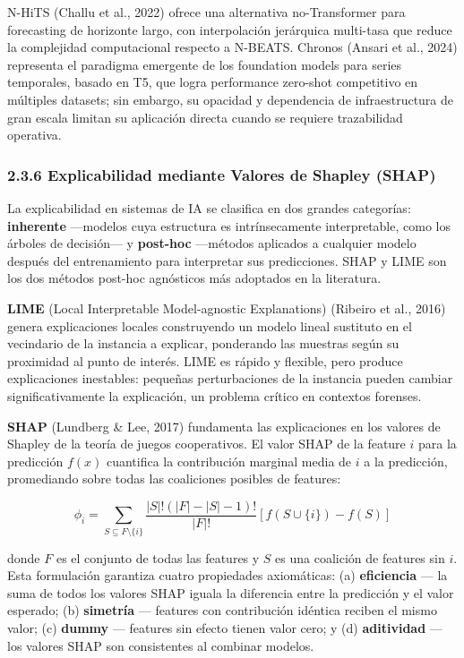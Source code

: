 N-HiTS (Challu et al., 2022) ofrece una alternativa no-Transformer para
forecasting de horizonte largo, con interpolación jerárquica multi-tasa
que reduce la complejidad computacional respecto a N-BEATS. Chronos
(Ansari et al., 2024) representa el paradigma emergente de los
foundation models para series temporales, basado en T5, que logra
performance zero-shot competitivo en múltiples datasets; sin embargo, su
opacidad y dependencia de infraestructura de gran escala limitan su
aplicación directa cuando se requiere trazabilidad operativa.

\subsubsection{2.3.6 Explicabilidad mediante Valores de Shapley
(SHAP)}\label{explicabilidad-mediante-valores-de-shapley-shap}

La explicabilidad en sistemas de IA se clasifica en dos grandes
categorías: \textbf{inherente} ---modelos cuya estructura es
intrínsecamente interpretable, como los árboles de decisión--- y
\textbf{post-hoc} ---métodos aplicados a cualquier modelo después del
entrenamiento para interpretar sus predicciones. SHAP y LIME son los dos
métodos post-hoc agnósticos más adoptados en la literatura.

\textbf{LIME} (Local Interpretable Model-agnostic Explanations) (Ribeiro
et al., 2016) genera explicaciones locales construyendo un modelo lineal
sustituto en el vecindario de la instancia a explicar, ponderando las
muestras según su proximidad al punto de interés. LIME es rápido y
flexible, pero produce explicaciones inestables: pequeñas perturbaciones
de la instancia pueden cambiar significativamente la explicación, un
problema crítico en contextos forenses.

\textbf{SHAP} (Lundberg \& Lee, 2017) fundamenta las explicaciones en
los valores de Shapley de la teoría de juegos cooperativos. El valor
SHAP de la feature \(i\) para la predicción \(f(x)\) cuantifica la
contribución marginal media de \(i\) a la predicción, promediando sobre
todas las coaliciones posibles de features:

\[\phi_i = \sum_{S \subseteq F \setminus \{i\}} \frac{|S|!(|F|-|S|-1)!}{|F|!} [f(S \cup \{i\}) - f(S)]\]

donde \(F\) es el conjunto de todas las features y \(S\) es una
coalición de features sin \(i\). Esta formulación garantiza cuatro
propiedades axiomáticas: (a) \textbf{eficiencia} --- la suma de todos
los valores SHAP iguala la diferencia entre la predicción y el valor
esperado; (b) \textbf{simetría} --- features con contribución idéntica
reciben el mismo valor; (c) \textbf{dummy} --- features sin efecto
tienen valor cero; y (d) \textbf{aditividad} --- los valores SHAP son
consistentes al combinar modelos.

